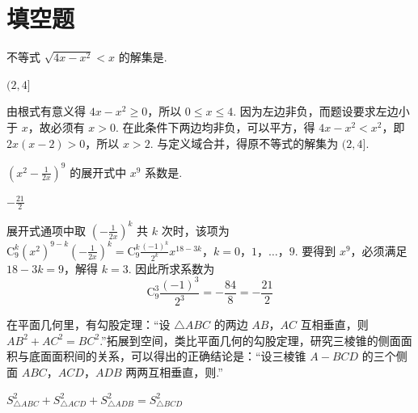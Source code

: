 \section{填空题}
\begin{problem}
不等式 \(\sqrt{4x - x^{2}} < x\) 的解集是\fillinblank{}.
\end{problem}

\begin{answer}
\((2,4]\)
\end{answer}

\begin{solution}
由根式有意义得 \(4x-x^{2}\geqslant0\)，所以 \(0\leqslant x\leqslant4\). 因为左边非负，而题设要求左边小于 \(x\)，故必须有 \(x>0\). 在此条件下两边均非负，可以平方，得 \(4x-x^{2}<x^{2}\)，即 \(2x(x-2)>0\)，所以 \(x>2\). 与定义域合并，得原不等式的解集为 \((2,4]\).
\end{solution}

\begin{problem}
\(\left(x^{2} - \frac{1}{2x}\right)^{9}\) 的展开式中 \(x^{9}\) 系数是\fillinblank{}.
\end{problem}

\begin{answer}
\(-\frac{21}{2}\)
\end{answer}

\begin{solution}
展开式通项中取 \(\left(-\frac{1}{2x}\right)^{k}\) 共 \(k\) 次时，该项为
\(\mathrm C_{9}^{k}\left(x^{2}\right)^{9-k}\left(-\frac{1}{2x}\right)^{k}=\mathrm C_{9}^{k}\frac{(-1)^{k}}{2^{k}}x^{18-3k}\)，\(k=0\)，\(1\)，\(\ldots\)，\(9\).
要得到 \(x^{9}\)，必须满足 \(18-3k=9\)，解得 \(k=3\). 因此所求系数为
\[
\mathrm C_{9}^{3}\frac{(-1)^{3}}{2^{3}}=-\frac{84}{8}=-\frac{21}{2}
\]
\end{solution}

\begin{problem}
在平面几何里，有勾股定理：“设 \(\triangle ABC\) 的两边 \(AB\)，\(AC\) 互相垂直，则 \(AB^2 + AC^2 = BC^2\).”拓展到空间，类比平面几何的勾股定理，研究三棱锥的侧面面积与底面面积间的关系，可以得出的正确结论是：“设三棱锥 \(A-BCD\) 的三个侧面 \(ABC\)，\(ACD\)，\(ADB\) 两两互相垂直，则\fillinblank{}.”

\end{problem}

\begin{answer}
\(S_{\triangle ABC}^{2}+S_{\triangle ACD}^{2}+S_{\triangle ADB}^{2}=S_{\triangle BCD}^{2}\)
\end{answer}

